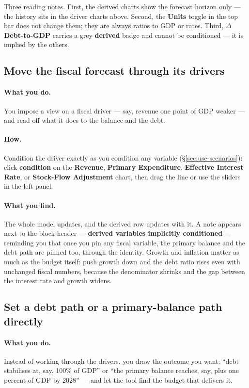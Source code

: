 \documentclass[11pt]{article}
\theoremstyle{definition}
\theoremstyle{remark}
\begin{document}
Three reading notes. First, the derived charts show the forecast horizon only --- the history
sits in the driver charts above. Second, the \textbf{Units} toggle in the top bar does not
change them; they are always ratios to GDP or rates. Third, \textbf{$\Delta$ Debt-to-GDP}
carries a grey \textbf{derived} badge and cannot be conditioned --- it is implied by the others.

\subsection{Move the fiscal forecast through its drivers}

\paragraph{What you do.} You impose a view on a fiscal driver --- say, revenue one point of GDP
weaker --- and read off what it does to the balance and the debt.

\paragraph{How.} Condition the driver exactly as you condition any variable
(\S\ref{sec:use-scenarios}): click \textbf{condition} on the \textbf{Revenue}, \textbf{Primary
Expenditure}, \textbf{Effective Interest Rate}, or \textbf{Stock-Flow Adjustment} chart, then
drag the line or use the sliders in the left panel.

\paragraph{What you find.} The whole model updates, and the derived row updates with it. A note
appears next to the block header --- \textbf{derived variables implicitly conditioned} ---
reminding you that once you pin any fiscal variable, the primary balance and the debt path are
pinned too, through the identity. Growth and inflation matter as much as the budget itself:
push growth down and the debt ratio rises even with unchanged fiscal numbers, because the
denominator shrinks and the gap between the interest rate and growth widens.

\subsection{Set a debt path or a primary-balance path directly}

\paragraph{What you do.} Instead of working through the drivers, you draw the outcome you want:
``debt stabilises at, say, 100\% of GDP'' or ``the primary balance reaches, say, plus one
percent of GDP by 2028'' --- and let the tool find the budget that delivers it.
\end{document}
